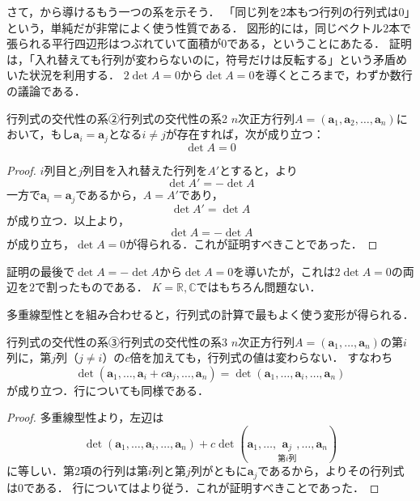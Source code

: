   さて，から導けるもう一つの系を示そう．
  「同じ列を$2$本もつ行列の行列式は$0$」という，単純だが非常によく使う性質である．
  図形的には，同じベクトル$2$本で張られる平行四辺形はつぶれていて面積が$0$である，ということにあたる．
  証明は，「入れ替えても行列が変わらないのに，符号だけは反転する」という矛盾めいた状況を利用する．
  $2\det A = 0$から$\det A = 0$を導くところまで，わずか数行の議論である．
\begin{cor}{行列式の交代性の系②}{行列式の交代性の系2}
  $n$次正方行列$A = (\bm{a}_1, \bm{a}_2, \dots, \bm{a}_n)$において，もし$\bm{a}_i = \bm{a}_j$となる$i \ne j$が存在すれば，次が成り立つ：
  \[
  \det A = 0
  \]
\end{cor}

\begin{tleftbar}
\begin{proof}
  $i$列目と$j$列目を入れ替えた行列を$A'$とすると，より
  \[
  \det A' = - \det A
  \]
  一方で$\bm{a}_i = \bm{a}_j$であるから，$A = A'$であり，
  \[
  \det A' = \det A
  \]
  が成り立つ．以上より，
  \[
  \det A = - \det A
  \]
  が成り立ち，$\det A = 0$が得られる．これが証明すべきことであった．
\end{proof}
\end{tleftbar}

証明の最後で$\det A = -\det A$から$\det A = 0$を導いたが，これは$2\det A = 0$の両辺を$2$で割ったものである．
$K = \mathbb{R}, \mathbb{C}$ではもちろん問題ない．

多重線型性とを組み合わせると，行列式の計算で最もよく使う変形が得られる．

\begin{cor}{行列式の交代性の系③}{行列式の交代性の系3}
  $n$次正方行列$A = (\bm{a}_1, \dots, \bm{a}_n)$の第$i$列に，第$j$列（$j \ne i$）の$c$倍を加えても，行列式の値は変わらない．
  すなわち
  \[
    \det(\bm{a}_1, \dots, \bm{a}_i + c\bm{a}_j, \dots, \bm{a}_n) = \det(\bm{a}_1, \dots, \bm{a}_i, \dots, \bm{a}_n)
  \]
  が成り立つ．行についても同様である．
\end{cor}

\begin{tleftbar}
\begin{proof}
  多重線型性より，左辺は
  \[
    \det(\bm{a}_1, \dots, \bm{a}_i, \dots, \bm{a}_n) + c \det(\bm{a}_1, \dots, \underset{\text{第$i$列}}{\bm{a}_j}, \dots, \bm{a}_n)
  \]
  に等しい．第$2$項の行列は第$i$列と第$j$列がともに$\bm{a}_j$であるから，よりその行列式は$0$である．
  行についてはより従う．これが証明すべきことであった．
\end{proof}
\end{tleftbar}

